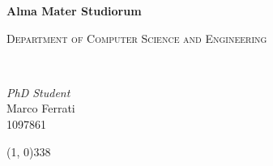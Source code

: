 \documentclass[../main.tex]{subfiles}
\begin{document}
    \begin{titlepage}
        \begin{center}
            \begin{Large}
                \textbf{Alma Mater Studiorum}\\
            \end{Large}

            \vspace{10pt}

            \begin{large}
                \textsc{Department of Computer Science and Engineering}\\
            \end{large}

            \vspace{10pt}

            \begin{LARGE}
                \begin{center}
                    \textbf{\theTitle}\\
                \end{center}
            \end{LARGE}

            \vspace{100pt}

            \begin{large}
                \begin{flushleft}
                    \textit{PhD Student}\\
                    \vspace{1pt}
                    Marco Ferrati\\
                    1097861
                \end{flushleft}
            \end{large}

            \vfill

            \line(1, 0){338} \\

        \end{center}
    \end{titlepage}
\end{document}
